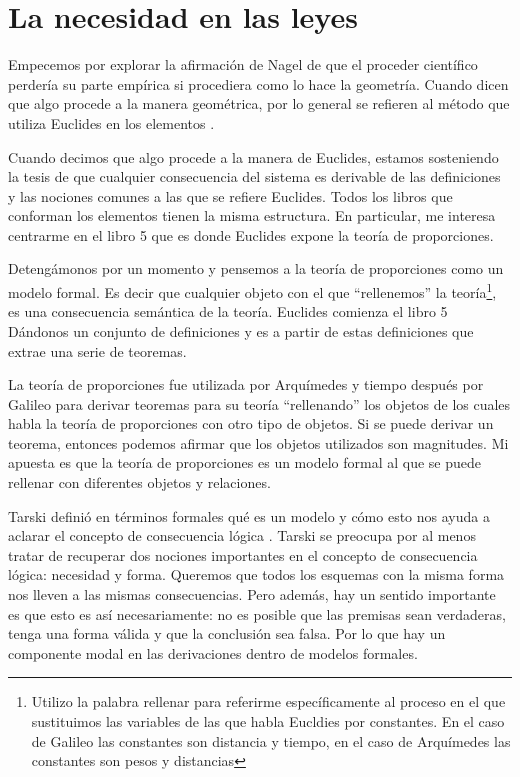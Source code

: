 \section{La necesidad en las leyes}

\noindent Empecemos por explorar la afirmación de Nagel de que el proceder científico perdería su parte empírica si procediera como lo hace la geometría. Cuando dicen que algo procede a la manera geométrica, por lo general se refieren al método que utiliza Euclides en los elementos \cite{Euclid2008}.

Cuando decimos que algo procede a la manera de Euclides, estamos sosteniendo la tesis de que cualquier consecuencia del sistema es derivable de las definiciones y las nociones comunes a las que se refiere Euclides. Todos los libros que conforman los elementos tienen la misma estructura. En particular, me interesa centrarme en el libro 5 que es donde Euclides expone la teoría de proporciones.

Detengámonos por un momento y pensemos a la teoría de proporciones como un modelo formal. Es decir que cualquier objeto con el que ``rellenemos'' la teoría\footnote{Utilizo la palabra rellenar para referirme específicamente al proceso en el que sustituimos las variables de las que habla Eucldies por constantes. En el caso de Galileo las constantes son distancia y tiempo, en el caso de Arquímedes las constantes son pesos y distancias}, es una consecuencia semántica de la teoría. Euclides comienza el libro 5 Dándonos un conjunto de definiciones y es a partir de estas definiciones que extrae una serie de teoremas.

La teoría de proporciones fue utilizada por Arquímedes y tiempo después por Galileo para derivar teoremas para su teoría ``rellenando'' los objetos de los cuales habla la teoría de proporciones con otro tipo de objetos. Si se puede derivar un teorema, entonces podemos afirmar que los objetos utilizados son magnitudes. Mi apuesta es que la teoría de proporciones es un modelo formal al que se puede rellenar con diferentes objetos y relaciones.

Tarski definió en términos formales qué es un modelo y cómo esto nos ayuda a aclarar el concepto de consecuencia lógica \cite{Tarski1956}. Tarski se preocupa por al menos tratar de recuperar dos nociones importantes en el concepto de consecuencia lógica: necesidad y forma. \cite{Torrente2000} Queremos que todos los esquemas con la misma forma nos lleven a las mismas consecuencias. Pero además, hay un sentido importante es que esto es así necesariamente: no es posible que las premisas sean verdaderas, tenga una forma válida y que la conclusión sea falsa. Por lo que hay un componente modal en las derivaciones dentro de modelos formales.


